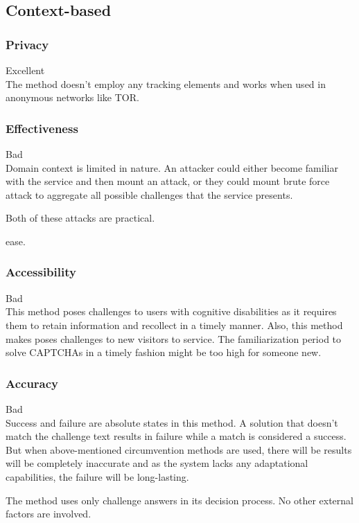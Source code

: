 \subsection{Context-based}

\subsubsection{Privacy}
Excellent\\
The method doesn't employ any tracking elements and works when used in anonymous
networks like TOR\@.

\subsubsection{Effectiveness}
Bad\\

Domain context is limited in nature. An attacker could either become familiar
with the service and then mount an attack, or they could mount brute force attack
to aggregate all possible challenges that the service presents.

Both of these attacks are practical.

ease.
\subsubsection{Accessibility}
Bad\\

This method poses challenges to users with cognitive disabilities as it requires
them to retain information and recollect in a timely manner. Also, this method
makes poses challenges to new visitors to service. The familiarization period to
solve CAPTCHAs in a timely fashion might be too high for someone new.

\subsubsection{Accuracy}
Bad\\
Success and failure are absolute states in this method. A solution that doesn't
match the challenge text results in failure while a match is considered a
success. But when above-mentioned circumvention methods are used, there will be
results will be completely inaccurate and as the system lacks any adaptational
capabilities, the failure will be long-lasting.  

The method uses only challenge answers in its decision process. No other
external factors are involved.
